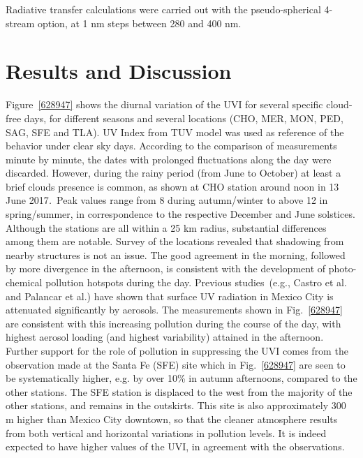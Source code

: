 \documentclass[10pt]{article}
\begin{document}
Radiative transfer calculations were carried out with the
pseudo-spherical 4-stream option, at 1 nm steps between 280 and 400 nm.

\section*{Results and Discussion}\label{results-and-discussion}

Figure~{\ref{628947}} shows the diurnal variation of
the UVI for several specific cloud-free days, for different seasons and
several locations (CHO, MER, MON, PED, SAG, SFE and TLA). UV Index from
TUV model was used as reference of the behavior under clear sky days.
According to the comparison of measurements minute by minute, the dates
with prolonged fluctuations along the day were discarded. However,
during the rainy period (from June to October) at least a brief clouds
presence is common, as shown at CHO station around noon in 13 June
2017\emph{.~}Peak values range from 8 during autumn/winter to above 12
in spring/summer, in correspondence to the respective December and June
solstices. Although the stations are all within a 25 km radius,
substantial differences among them are notable. Survey of the locations
revealed that shadowing from nearby structures is not an issue. The good
agreement in the morning, followed by more divergence in the afternoon,
is consistent with the development of photo-chemical pollution hotspots
during the day. Previous studies~(e.g., Castro et
al.\cite{Castro_2001} and Palancar et al.\cite{Palancar_2013}) have shown
that surface UV radiation in Mexico City is attenuated significantly by
aerosols. The measurements shown in Fig.~{\ref{628947}}
are consistent with this increasing pollution during the course of the
day, with highest aerosol loading (and highest variability) attained in
the afternoon. Further support for the role of pollution in suppressing
the UVI comes from the observation made at the Santa Fe (SFE) site which
in Fig.~{\ref{628947}} are seen to be systematically
higher, e.g. by over 10\% in autumn afternoons, compared to the other
stations. The SFE station is displaced to the west from the majority of
the other stations, and remains in the outskirts. This site is also
approximately 300 m higher than Mexico City downtown, so that the
cleaner atmosphere results from both vertical and horizontal variations
in pollution levels.\cite{SEDEMA2018a} It is indeed expected to have
higher values of the UVI, in agreement with the observations.
\end{document}
